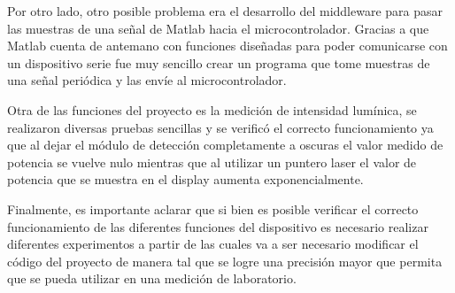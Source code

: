 Por otro lado, otro posible problema era el desarrollo del middleware para pasar las muestras de una señal de Matlab hacia el microcontrolador. Gracias a que Matlab cuenta de antemano con funciones diseñadas para poder comunicarse con un dispositivo serie fue muy sencillo crear un programa que tome muestras de una señal periódica y las envíe al microcontrolador.

Otra de las funciones del proyecto es la medición de intensidad lumínica, se realizaron diversas pruebas sencillas y se verificó el correcto funcionamiento ya que al dejar el módulo de detección completamente a oscuras el valor medido de potencia se vuelve nulo mientras que al utilizar un puntero laser el valor de potencia que se muestra en el display aumenta exponencialmente.

Finalmente, es importante aclarar que si bien es posible verificar el correcto funcionamiento de las diferentes funciones del dispositivo es necesario realizar diferentes experimentos a partir de las cuales va a ser necesario modificar el código del proyecto de manera tal que se logre una precisión mayor que permita que se pueda utilizar en una medición de laboratorio.